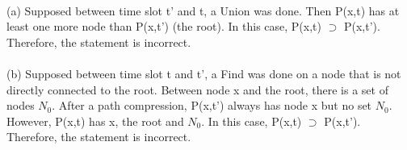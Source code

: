 \begin{problem}{2} ~\\
(a) Supposed between time slot t' and t, a Union was done. Then P(x,t) has at least one more node than P(x,t') (the root). In this case, P(x,t) $\supset$ P(x,t'). Therefore, the statement is incorrect. \\
\\
(b) Supposed between time slot t and t', a Find was done on a node that is not directly connected to the root. Between node x and the root, there is a set of nodes $N_0$. After a path compression, P(x,t') always has node x but no set $N_0$. However, P(x,t) has x, the root and $N_0$. In this case, P(x,t) $\supset$ P(x,t'). Therefore, the statement is incorrect.
\end{problem}